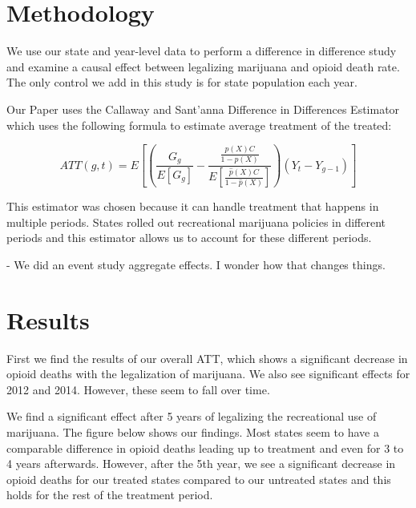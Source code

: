 \documentclass{article}
\begin{document}





\section*{Methodology} %

We use our state and year-level data to perform a difference in difference study and examine a causal effect between legalizing marijuana and opioid death rate. The only control we add in this study is for state population each year. 

Our Paper uses the Callaway and Sant'anna Difference in Differences Estimator which uses the following formula to estimate average treatment of the treated:

$$ATT(g,t)=E[(  \frac{G_g}{ E[G_g]} - \frac{ \frac{ \hat{p} (X)C}{1- \hat{p} (X)}}{E [\frac{\hat{p} (X) C } {1 - \hat{p} (X)}]}) (Y_t - Y_{g-1})]$$

This estimator was chosen because it can handle treatment that happens in multiple periods. States rolled out recreational marijuana policies in different periods and this estimator allows us to account for these different periods. 

- We did an event study aggregate effects. I wonder how that changes things. 

\section*{Results}

First we find the results of our overall ATT, which shows a significant decrease in opioid deaths with the legalization of marijuana. We also see significant effects for 2012 and 2014. However, these seem to fall over time.



We find a significant effect after 5 years of legalizing the recreational use of marijuana. The figure below shows our findings. Most states seem to have a comparable difference in opioid deaths leading up to treatment and even for 3 to 4 years afterwards. However, after the 5th year, we see a significant decrease in opioid deaths for our treated states compared to our untreated states and this holds for the rest of the treatment period. 
\end{document}
